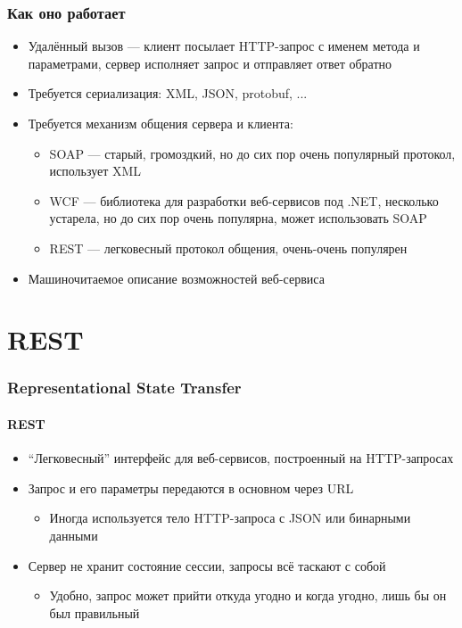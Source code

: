 \documentclass{../../slides-style}
\begin{document}
    \begin{frame}
        \frametitle{Как оно работает}
        \begin{itemize}
            \item Удалённый вызов --- клиент посылает HTTP-запрос с именем метода и параметрами, сервер исполняет запрос и отправляет ответ обратно
            \item Требуется сериализация: XML, JSON, protobuf, ...
            \item Требуется механизм общения сервера и клиента:
            \begin{itemize}
                \item SOAP --- старый, громоздкий, но до сих пор очень популярный протокол, использует XML
                \item WCF --- библиотека для разработки веб-сервисов под .NET, несколько устарела, но до сих пор очень популярна, может использовать SOAP
                \item REST --- легковесный протокол общения, очень-очень популярен
            \end{itemize}
            \item Машиночитаемое описание возможностей веб-сервиса
        \end{itemize}
    \end{frame}

    \section{REST}

    \begin{frame}
        \frametitle{Representational State Transfer}
        \framesubtitle{REST}
        \begin{itemize}
            \item ``Легковесный'' интерфейс для веб-сервисов, построенный на HTTP-запросах
            \item Запрос и его параметры передаются в основном через URL
            \begin{itemize}
                \item Иногда используется тело HTTP-запроса с JSON или бинарными данными
            \end{itemize}
            \item Сервер не хранит состояние сессии, запросы всё таскают с собой
            \begin{itemize}
                \item Удобно, запрос может прийти откуда угодно и когда угодно, лишь бы он был правильный
            \end{itemize}
        \end{itemize}
    \end{frame}
\end{document}
